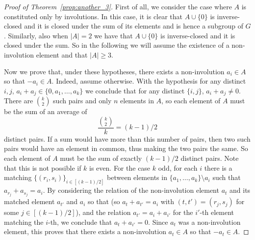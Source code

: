 \documentclass[11pt]{amsart}
\theoremstyle{definition}
\begin{document}
\begin{proof}[Proof of Theorem~\ref{prop:another_3}]
First of all, we consider the case where $A$ is constituted only by involutions. In this case, it is clear that $A\cup \{0\}$ is inverse-closed and it is closed under the sum of its elements and is hence a subgroup of $G$. Similarly, also when $|A|=2$ we have that $A\cup \{0\}$ is inverse-closed and it is closed under the sum. So in the following we will assume the existence of a non-involution element and that $|A|\geq 3$.

Now we prove that, under these hypotheses, there exists a non-involution $a_i\in A$ so that $-a_i\in A$.
Indeed, assume otherwise. With the hypothesis for any distinct $i,j$, $a_i+a_j\in \{0,a_1,\ldots,a_k\}$ we conclude that for any distinct $\{i,j\}$, $a_i+a_j\not=0$. There are ${k \choose 2}$ such pairs and only $n$ elements in $A$, so each element of $A$ must be the sum of an average of  $$\frac{{k \choose 2}}{k}=(k-1)/2$$ distinct pairs.
If a sum would have more than this number of pairs, then two such pairs would have an element in common, thus making the two pairs the same. So each element of $A$ must be the sum of exactly $(k-1)/2$ distinct pairs. Note that this is not possible if $k$ is even. For the case $k$ odd, for each $i$ there is a matching $\{(r_i,s_i)\}_{i\in[(k-1)/2]}$ between elements in $\{a_1,\ldots,a_k\}\setminus a_i$ such that $a_{r_j}+a_{s_j}=a_i$. By considering the relation of the non-involution element $a_t$ and its matched element $a_{t'}$ and $a_i$ so that (so $a_t+a_{t'}=a_i$ with $(t,t')=(r_j,s_j)$ for some $j\in [(k-1)/2]$), and the relation $a_{t'}=a_i+a_{i'}$ for the $i'$-th element matching the $i$-th, we conclude that $a_t+a_{i'}=0$. Since $a_t$ was a non-involution element, this proves that there exists a non-involution $a_t\in A$ so that $-a_t\in A$. 




\end{proof}
\end{document}
